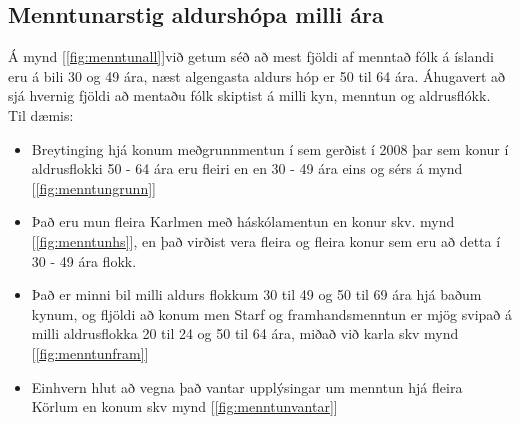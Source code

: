 \documentclass[12pt, svn, draft]{rureport}
\begin{document}
\subsection{Menntunarstig aldurshópa milli ára}
Á mynd [\ref{fig:menntunall}]við getum séð að mest fjöldi af menntað fólk á íslandi eru á bili 30 og 49 ára, næst algengasta aldurs hóp er 50 til 64 ára.
Áhugavert að sjá hvernig fjöldi að mentaðu fólk skiptist á milli kyn, menntun og aldrusflókk. Til dæmis:
\begin{itemize}  
	
	\item Breytinging hjá konum meðgrunnmentun í sem gerðist í  2008 þar sem konur í aldrusflokki 50 - 64 ára eru fleiri en  en 30 - 49 ára eins og sérs á mynd [\ref{fig:menntungrunn}]
	
	\item Það eru mun fleira Karlmen með háskólamentun en konur skv. mynd [\ref{fig:menntunhs}], en það virðist vera fleira og fleira konur sem eru að detta í 30 - 49 ára flokk.
	
	\item Það er minni bil milli aldurs flokkum 30 til 49 og 50 til 69 ára hjá baðum kynum,
	og fljöldi að konum men Starf og framhandsmenntun er mjög svipað á milli aldrusflokka 20 til 24 og 50 til 64 ára, miðað við karla skv mynd [\ref{fig:menntunfram}] 
	
	\item Einhvern hlut að vegna það vantar upplýsingar um menntun hjá fleira Körlum en konum skv mynd [\ref{fig:menntunvantar}]
	
\end{itemize}

\end{document}
